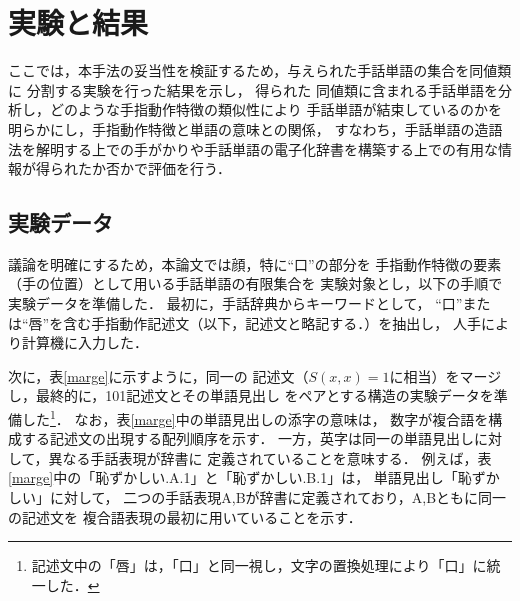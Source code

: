 \section{実験と結果}

ここでは，本手法の妥当性を検証するため，与えられた手話単語の集合を同値類に
分割する実験を行った結果を示し，
得られた
同値類に含まれる手話単語を分析し，どのような手指動作特徴の類似性により
手話単語が結束しているのかを明らかにし，手指動作特徴と単語の意味との関係，
すなわち，手話単語の造語法を解明する上での手がかりや手話単語の電子化辞書を構築する上での有用な情報が得られたか否かで評価を行う．

\subsection{実験データ}\label{pre}

議論を明確にするため，本論文では顔，特に``口''の部分を
手指動作特徴の要素（手の位置）として用いる手話単語の有限集合を
実験対象とし，以下の手順で実験データを準備した．
最初に，手話辞典\cite{MaruyamaKoji1984}からキーワードとして，
``口''または``唇''を含む手指動作記述文（以下，記述文と略記する．）を抽出し，
人手により計算機に入力した．

次に，表\ref{marge}に示すように，同一の
記述文（$S(x,x) = 1$に相当）をマージし，最終的に，101記述文とその単語見出し
をペアとする構造の実験データを準備した\footnote{記述文中の「唇」は，「口」と同一視し，文字の置換処理により「口」に統一した．}．
なお，表\ref{marge}中の単語見出しの添字の意味は，
数字が複合語を構成する記述文の出現する配列順序を示す．
一方，英字は同一の単語見出しに対して，異なる手話表現が辞書に
定義されていることを意味する．
例えば，表\ref{marge}中の「恥ずかしい.A.1」と「恥ずかしい.B.1」は，
単語見出し「恥ずかしい」に対して，
二つの手話表現A,Bが辞書に定義されており，A,Bともに同一の記述文を
複合語表現の最初に用いていることを示す．

